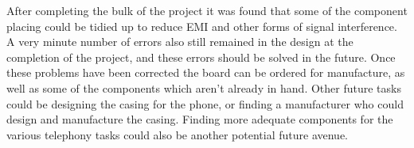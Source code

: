 	After completing the bulk of the project it was found that some of the component placing could be tidied up to reduce EMI and other forms of signal interference. 
A very minute number of errors also still remained in the design at the completion of the project, and these errors should be solved in the future.
Once these problems have been corrected the board can be ordered for manufacture, as well as some of the components which aren't already in hand.
Other future tasks could be designing the casing for the phone, or finding a manufacturer who could design and manufacture the casing.
Finding more adequate components for the various telephony tasks could also be another potential future avenue.




